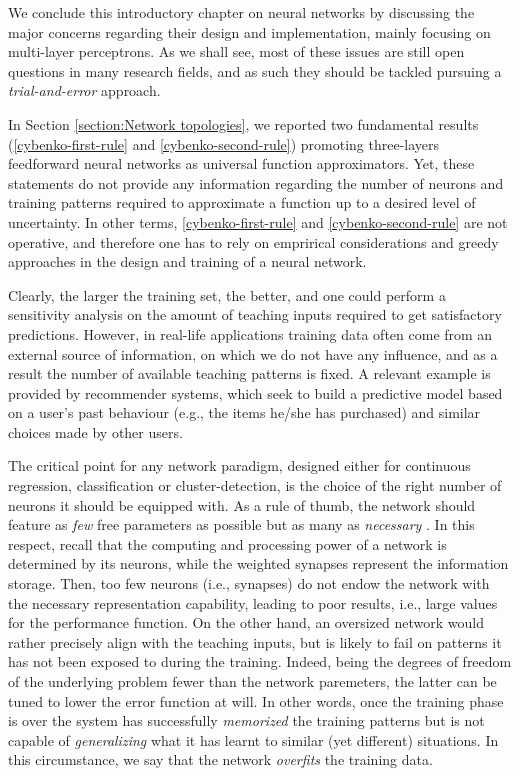 \documentclass[12pt, a4paper, twoside, openright]{report}
\numberwithin{equation}{chapter}
\theoremstyle{theorem}
\theoremstyle{definition}
\theoremstyle{remark}
\theoremstyle{proposition}
\numberwithin{figure}{chapter}
\begin{document}
		We conclude this introductory chapter on neural networks by discussing the major concerns regarding their design and implementation, mainly focusing on multi-layer perceptrons. As we shall see, most of these issues are still open questions in many research fields, and as such they should be tackled pursuing a \emph{trial-and-error} approach.
		
		In Section \ref{section:Network topologies}, we reported two fundamental results (\ref{cybenko-first-rule} and \ref{cybenko-second-rule}) promoting three-layers feedforward neural networks as universal function approximators. Yet, these statements do not provide any information regarding the number of neurons and training patterns required to approximate a function up to a desired level of uncertainty. In other terms, \ref{cybenko-first-rule} and \ref{cybenko-second-rule} are not operative, and therefore one has to rely on emprirical considerations and greedy approaches in the design and training of a neural network.  
		
		Clearly, the larger the training set, the better, and one could perform a sensitivity analysis on the amount of teaching inputs required to get satisfactory predictions. However, in real-life applications training data often come from an external source of information, on which we do not have any influence, and as a result the number of available teaching patterns is fixed. A relevant example is provided by recommender systems, which seek to build a predictive model based on a user's past behaviour (e.g., the items he/she has purchased) and similar choices made by other users. 
				
		The critical point for any network paradigm, designed either for continuous regression, classification or cluster-detection, is the choice of the right number of neurons it should be equipped with. As a rule of thumb, the network should feature as \emph{few} free parameters as possible but as many as \emph{necessary} \cite{Kri}. In this respect, recall that the computing and processing power of a network is determined by its neurons, while the weighted synapses represent the information storage. Then, too few neurons (i.e., synapses) do not endow the network with the necessary representation capability, leading to poor results, i.e., large values for the performance function. On the other hand, an oversized network would rather precisely align with the teaching inputs, but is likely to fail on patterns it has not been exposed to during the training. Indeed, being the degrees of freedom of the underlying problem fewer than the network paremeters, the latter can be tuned to lower the error function at will. In other words, once the training phase is over the system has successfully \emph{memorized} the training patterns but is not capable of \emph{generalizing} what it has learnt to similar (yet different) situations. In this circumstance, we say that the network \emph{overfits} the training data. 
		
\end{document}
